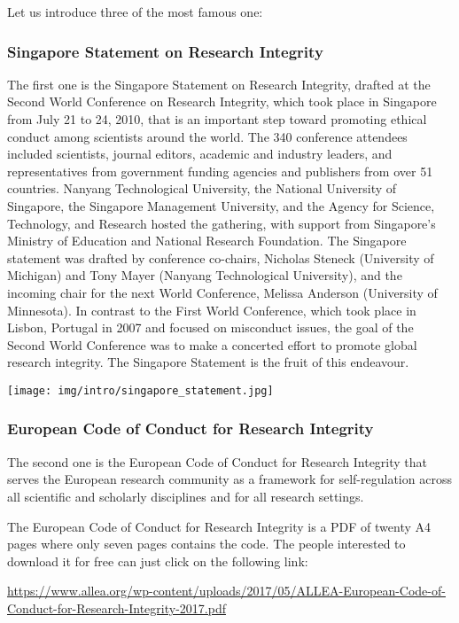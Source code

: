	Let us introduce three of the most famous one:
	\subsubsection{Singapore Statement on Research Integrity}
	The first one is the Singapore Statement on Research Integrity, drafted at the Second World Conference on Research Integrity, which took place in Singapore from July 21 to 24, 2010, that is an important step toward promoting ethical conduct among scientists around the world. The 340 conference attendees included scientists, journal editors, academic and industry leaders, and representatives from government funding agencies and publishers from over 51 countries. Nanyang Technological University, the National University of Singapore, the Singapore Management University, and the Agency for Science, Technology, and Research hosted the gathering, with support from Singapore's Ministry of Education and National Research Foundation. The Singapore statement was drafted by conference co-chairs, Nicholas Steneck (University of Michigan) and Tony Mayer (Nanyang Technological University), and the incoming chair for the next World Conference, Melissa Anderson (University of Minnesota). In contrast to the First World Conference, which took place in Lisbon, Portugal in 2007 and focused on misconduct issues, the goal of the Second World Conference was to make a concerted effort to promote global research integrity. The Singapore Statement is the fruit of this endeavour.
	\begin{center}
		\texttt{[image: img/intro/singapore\_statement.jpg]}
	\end{center}
	
	\subsubsection{European Code of Conduct for Research Integrity }
	The second one is the European Code of Conduct for Research Integrity that serves the European research community as a framework for self-regulation across all scientific and scholarly disciplines and for all research settings.
	
	The European Code of Conduct for Research Integrity  is a PDF of twenty A4 pages where only seven pages contains the code. The people interested to download it for free can just click on the following link:
	
	\begin{center}
	\url{https://www.allea.org/wp-content/uploads/2017/05/ALLEA-European-Code-of-Conduct-for-Research-Integrity-2017.pdf}
	\end{center}
	
